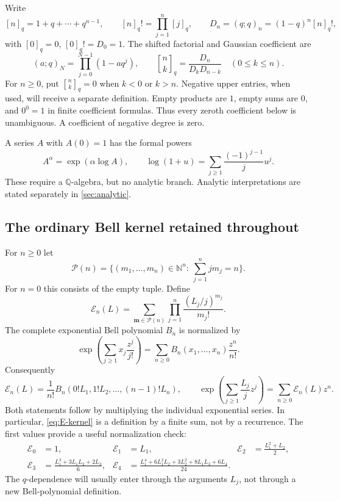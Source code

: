 \documentclass[11pt,a4paper]{article}
\numberwithin{equation}{section}
\theoremstyle{definition}
\theoremstyle{remark}
\newcommand{\Q}{\mathbb Q}
\newcommand{\N}{\mathbb N}
\newcommand{\qb}[2]{\genfrac{[}{]}{0pt}{}{#1}{#2}_{q}}
\newcommand{\qf}[1]{[#1]_{q}!}
\newcommand{\qi}[1]{[#1]_{q}}
\newcommand{\poch}[3]{(#1;#2)_{#3}}
\newcommand{\Ecal}{\mathcal E}
\newcommand{\Pcal}{\mathcal P}
\begin{document}
Write
\begin{equation}\label{eq:definitions}
 \qi n=1+q+\cdots+q^{n-1},\qquad
 \qf n=\prod_{j=1}^n\qi j,\qquad
 D_n=\poch q q n=(1-q)^n\qf n,
\end{equation}
with $\qi0=0$, $\qf0=D_0=1$. The shifted factorial and Gaussian coefficient are
\begin{equation}\label{eq:gauss-def}
 \poch a q N=\prod_{j=0}^{N-1}(1-aq^j),\qquad
 \qb nk=\frac{D_n}{D_kD_{n-k}}\quad(0\le k\le n).
\end{equation}
For $n\ge0$, put $\qb nk=0$ when $k<0$ or $k>n$. Negative upper entries, when used,
will receive a separate definition. Empty products are $1$, empty sums are $0$,
and $0^0=1$ in finite coefficient formulas. Thus every zeroth coefficient below
is unambiguous. A coefficient of negative degree is zero.

A series $A$ with $A(0)=1$ has the formal powers
\begin{equation}\label{eq:formal-power}
 A^\alpha=\exp(\alpha\log A),\qquad
 \log(1+u)=\sum_{j\ge1}\frac{(-1)^{j-1}}j u^j.
\end{equation}
These require a $\Q$-algebra, but no analytic branch. Analytic interpretations are
stated separately in \cref{sec:analytic}.

\subsection{The ordinary Bell kernel retained throughout}
For $n\ge0$ let
\[
 \Pcal(n)=\{(m_1,\ldots,m_n)\in\N^n:\ \sum_{j=1}^n jm_j=n\}.
\]
For $n=0$ this consists of the empty tuple. Define
\begin{equation}\label{eq:E-kernel}
 \Ecal_n(L)=\sum_{\bm m\in\Pcal(n)}
       \prod_{j=1}^n\frac{(L_j/j)^{m_j}}{m_j!}.
\end{equation}
The complete exponential Bell polynomial $B_n$ is normalized by
\begin{equation}\label{eq:Bell-def}
 \exp\left(\sum_{j\ge1}x_j\frac{z^j}{j!}\right)
  =\sum_{n\ge0}B_n(x_1,\ldots,x_n)\frac{z^n}{n!}.
\end{equation}
Consequently
\begin{equation}\label{eq:E-Bell}
 \Ecal_n(L)=\frac1{n!}B_n(0!L_1,1!L_2,\ldots,(n-1)!L_n),\qquad
 \exp\left(\sum_{j\ge1}\frac{L_j}jz^j\right)
       =\sum_{n\ge0}\Ecal_n(L)z^n.
\end{equation}
Both statements follow by multiplying the individual exponential series. In
particular, \eqref{eq:E-kernel} is a definition by a finite sum, not by a recurrence.
The first values provide a useful normalization check:
\begin{align}\label{eq:E-small}
 \Ecal_0&=1,&\Ecal_1&=L_1,&
 \Ecal_2&=\frac{L_1^2+L_2}{2},\\
 \Ecal_3&=\frac{L_1^3+3L_1L_2+2L_3}{6},&
 \Ecal_4&=\frac{L_1^4+6L_1^2L_2+3L_2^2+8L_1L_3+6L_4}{24}.
 \nonumber
\end{align}
The $q$-dependence will usually enter through the arguments $L_j$, not through a
new Bell-polynomial definition.
\end{document}

